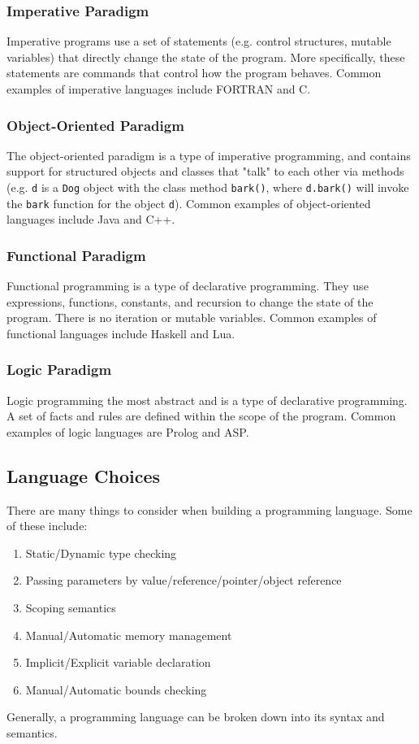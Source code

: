 \documentclass{article}
\begin{document}
\subsubsection{Imperative Paradigm} Imperative programs use a set of
statements (e.g. control structures, mutable variables) that directly
change the state of the program. More specifically, these statements
are commands that control how the program behaves. Common examples of
imperative languages include FORTRAN and C.

\subsubsection{Object-Oriented Paradigm} The object-oriented paradigm
is a type of imperative programming, and contains support for
structured objects and classes that "talk" to each other via methods
(e.g. \texttt{d} is a \texttt{Dog} object with the class method
\texttt{bark()}, where \texttt{d.bark()} will invoke the \texttt{bark}
function for the object \texttt{d}). Common examples of
object-oriented languages include Java and C++.

\subsubsection{Functional Paradigm} Functional programming is a type of
declarative programming. They use expressions, functions, constants,
and recursion to change the state of the program. There is no
iteration or mutable variables. Common examples of functional
languages include Haskell and Lua.

\subsubsection{Logic Paradigm} Logic programming the most abstract and is
a type of declarative programming. A set of facts and rules are
defined within the scope of the program. Common examples of logic
languages are Prolog and ASP.

\subsection{Language Choices} There are many things to consider when
building a programming language. Some of these include:
\begin{enumerate}[label=(\roman*),align=left]
\item Static/Dynamic type checking
\item Passing parameters by value/reference/pointer/object reference
\item Scoping semantics
\item Manual/Automatic memory management
\item Implicit/Explicit variable declaration
\item Manual/Automatic bounds checking
\end{enumerate} Generally, a programming language can be broken down
into its syntax and semantics.
\end{document}
